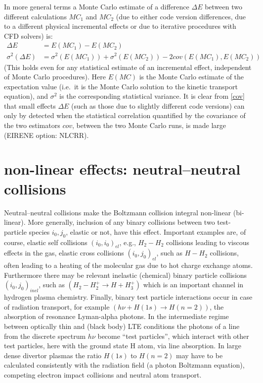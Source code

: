 In more general terms a Monte Carlo estimate  of a difference $\Delta E$
between two different calculations $MC_1$ and $MC_2$ (due to either code
version differences, due to a different physical incremental effects or due to
iterative procedures with \ac{CFD} solvers) is:
\begin{align}
  \label{cov}
  \Delta E           & = E(MC_1) - E(MC_2)  \nonumber
  \\
  \sigma^2(\Delta E) & = \sigma^2(E(MC_1)) + \sigma^2(E(MC_2)) - 2
  cov(E(MC_1),E(MC_2))
\end{align}
(This holds even for any statistical estimate of an incremental effect,
independent of Monte Carlo procedures).
Here $E(MC)$ is the Monte Carlo estimate of the expectation value (i.e.\ it is
the Monte Carlo solution to the kinetic transport equation), and $\sigma^2$ is
the corresponding statistical variance.
It is clear from \cref{cov} that small effects $\Delta E$ (such as those due to
slightly different code versions) can only by detected when the statistical
correlation quantified by the covariance of the two estimators $cov$, between
the two Monte Carlo runs, is made large (EIRENE option: NLCRR).

\newpage

\section{non-linear effects: neutral--neutral collisions}  \label{sec1.8}

Neutral--neutral collisions make the Boltzmann collision integral non-linear
(bi-linear).
More generally, inclusion of any binary collisions between two test-particle
species $i_0, j_0$, elastic or not, have this effect.
Important examples are, of course, elastic self collisions $(i_0,i_0)_{el}$,
e.g., $H_2-H_2$ collisions leading to viscous effects in the gas, elastic cross
collisions $(i_0,j_0)_{el}$, such as $H-H_2$ collisions, often leading to a
heating of the molecular gas due to hot charge exchange atoms.
Furthermore there may be relevant inelastic (chemical) binary particle
collisions $(i_0,j_0)_{inel}$, such as $(H_2-H^+_2 \rightarrow H+H_3^+)$ which
is an important channel in hydrogen plasma chemistry.
Finally, binary test particle interactions occur in case of radiation
transport, for example $(h\nu + H(1s) \rightarrow H(n=2))$, the absorption of
resonance Lyman-alpha photons.
In the intermediate regime between optically thin and (black body) LTE
conditions the photons of a line from the discrete spectrum $h\nu$ become
``test particles'', which interact with other test particles, here with the
ground state H atom, via line absorption.
In large dense divertor plasmas the ratio $H(1s)$ to $H(n=2)$ may have to be
calculated consistently with the radiation field (a photon Boltzmann equation),
competing electron impact collisions and neutral atom transport.

